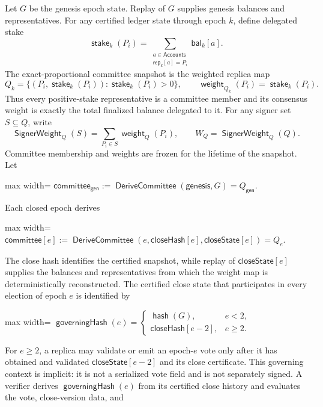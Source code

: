 \documentclass[sigplan,twocolumn,review,anonymous]{acmart}
\newcommand{\func}[1]{\operatorname{\mathsf{#1}}}
\newcommand{\hash}{\func{hash}}
\newcommand{\closeHash}{\mathsf{closeHash}}
\newcommand{\committee}{\mathsf{committee}}
\newcommand{\deriveCommittee}{\func{DeriveCommittee}}
\newcommand{\closeState}{\mathsf{closeState}}
\newcommand{\governingHash}{\func{governingHash}}
\newcommand{\bal}{\mathsf{bal}}
\newcommand{\repOf}{\mathsf{rep}}
\newcommand{\stake}{\func{stake}}
\newcommand{\weight}{\func{weight}}
\newcommand{\SignerWeight}{\func{SignerWeight}}
\begin{document}
Let \(G\) be the genesis epoch state.  Replay of \(G\) supplies genesis balances and
representatives.  For any certified ledger state through epoch \(k\), define delegated stake
\[
\stake_k(P_i)=
\sum_{\substack{a\in\mathsf{Accounts}\\\repOf_k[a]=P_i}}\bal_k[a].
\]
The exact-proportional committee snapshot is the weighted replica map
\[
Q_k=\{(P_i,\stake_k(P_i)):\stake_k(P_i)>0\},
\qquad
\weight_{Q_k}(P_i)=\stake_k(P_i).
\]
Thus every positive-stake representative is a committee member and its consensus weight is exactly the
total finalized balance delegated to it.  For any signer set \(S\subseteq Q\), write
\[
\SignerWeight_Q(S)=\sum_{P_i\in S}\weight_Q(P_i),
\qquad W_Q=\SignerWeight_Q(Q).
\]
Committee membership and weights are frozen for the lifetime of the snapshot.  Let
\begin{center}
\begin{adjustbox}{max width=\columnwidth}
\(\displaystyle
    \committee_{\mathsf{gen}}:=\deriveCommittee(\mathsf{genesis},G)=Q_{\mathsf{gen}}.
\)
\end{adjustbox}
\end{center}
Each closed epoch derives
\begin{center}
\begin{adjustbox}{max width=\columnwidth}
\(\displaystyle
    \committee[e]:=\deriveCommittee(e,\closeHash[e],\closeState[e])=Q_e.
\)
\end{adjustbox}
\end{center}
The close hash identifies the certified snapshot, while replay of \(\closeState[e]\) supplies the
balances and representatives from which the weight map is deterministically reconstructed.
The certified close state that participates in every election of epoch \(e\) is identified by
\begin{center}
\begin{adjustbox}{max width=\columnwidth}
\(\displaystyle
\governingHash(e)=
\begin{cases}
\hash(G), & e<2,\\
\closeHash[e-2], & e\ge 2.
\end{cases}
\)
\end{adjustbox}
\end{center}
For \(e\ge2\), a replica may validate or emit an epoch-\(e\) vote only after it has obtained and
validated \(\closeState[e-2]\) and its close certificate.  This governing context is implicit: it is
not a serialized vote field and is not separately signed.  A verifier derives
\(\governingHash(e)\) from its certified close history and evaluates the vote, close-version data, and
\end{document}
